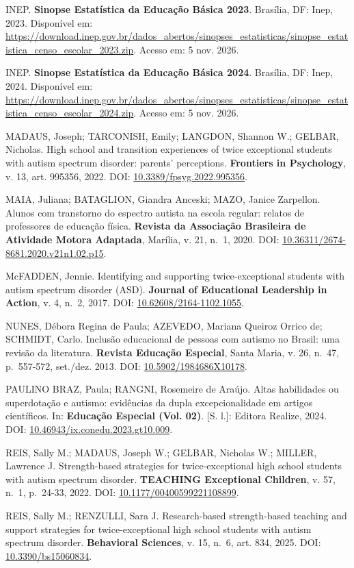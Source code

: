 INEP. \textbf{Sinopse Estatística da Educação Básica 2023}. Brasília,
DF: Inep, 2023. Disponível em:
\url{https://download.inep.gov.br/dados_abertos/sinopses_estatisticas/sinopse_estatistica_censo_escolar_2023.zip}.
Acesso em: 5 nov. 2026.

INEP. \textbf{Sinopse Estatística da Educação Básica 2024}. Brasília,
DF: Inep, 2024. Disponível em:
\url{https://download.inep.gov.br/dados_abertos/sinopses_estatisticas/sinopse_estatistica_censo_escolar_2024.zip}.
Acesso em: 5 nov. 2026.

MADAUS, Joseph; TARCONISH, Emily; LANGDON, Shannon W.; GELBAR, Nicholas.
High school and transition experiences of twice exceptional students
with autism spectrum disorder: parents' perceptions. \textbf{Frontiers
in Psychology}, v. 13, art. 995356, 2022. DOI:
\url{10.3389/fpsyg.2022.995356}.

MAIA, Juliana; BATAGLION, Giandra Anceski; MAZO, Janice Zarpellon.
Alunos com transtorno do espectro autista na escola regular: relatos de
professores de educação física. \textbf{Revista da Associação Brasileira
de Atividade Motora Adaptada}, Marília, v. 21, n.~1, 2020. DOI:
\url{10.36311/2674-8681.2020.v21n1.02.p15}.

McFADDEN, Jennie. Identifying and supporting twice-exceptional students
with autism spectrum disorder (ASD). \textbf{Journal of Educational
Leadership in Action}, v. 4, n.~2, 2017. DOI: \url{10.62608/2164-1102.1055}.

NUNES, Débora Regina de Paula; AZEVEDO, Mariana Queiroz Orrico de;
SCHMIDT, Carlo. Inclusão educacional de pessoas com autismo no Brasil:
uma revisão da literatura. \textbf{Revista Educação Especial}, Santa
Maria, v. 26, n.~47, p.~557-572, set./dez. 2013. DOI:
\url{10.5902/1984686X10178}.

PAULINO BRAZ, Paula; RANGNI, Rosemeire de Araújo. Altas habilidades ou
superdotação e autismo: evidências da dupla excepcionalidade em artigos
científicos. In: \textbf{Educação Especial (Vol. 02)}. {[}S. l.{]}:
Editora Realize, 2024. DOI: \url{10.46943/ix.conedu.2023.gt10.009}.

REIS, Sally M.; MADAUS, Joseph W.; GELBAR, Nicholas W.; MILLER, Lawrence
J. Strength-based strategies for twice-exceptional high school students
with autism spectrum disorder. \textbf{TEACHING Exceptional Children},
v. 57, n.~1, p.~24-33, 2022. DOI: \url{10.1177/00400599221108899}.

REIS, Sally M.; RENZULLI, Sara J. Research-based strength-based teaching
and support strategies for twice-exceptional high school students with
autism spectrum disorder. \textbf{Behavioral Sciences}, v. 15, n.~6,
art. 834, 2025. DOI: \url{10.3390/bs15060834}.

